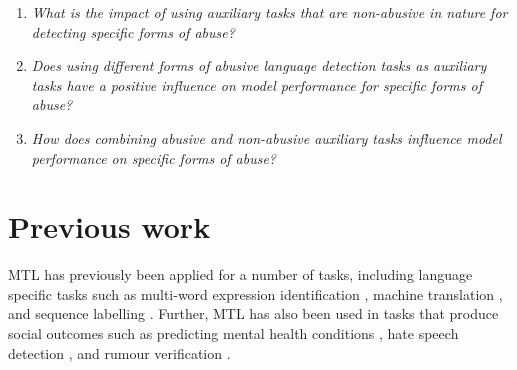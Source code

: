 \begin{minipage}{0.9\textwidth}
\vspace{5mm}
    \begin{enumerate}[start=1, label={\textbf{RQ \arabic*}}]
        \item{\textit{What is the impact of using auxiliary tasks that are non-abusive in nature for detecting specific forms of abuse?}}
        \item{\textit{Does using different forms of abusive language detection tasks as auxiliary tasks have a positive influence on model performance for specific forms of abuse?}}
        \item{\textit{How does combining abusive and non-abusive auxiliary tasks influence model performance on specific forms of abuse?}}
    \end{enumerate}
\end{minipage}

\section{Previous work}

MTL has previously been applied for a number of tasks, including language specific tasks such as multi-word expression identification \cite{Bingel-Bjerva:2018}, machine translation \cite{Dong:2015}, and sequence labelling \cite{Rei:2017}.
Further, MTL has also been used in tasks that produce social outcomes such as predicting mental health conditions \cite{Benton:2017}, hate speech detection \cite{Waseem:2018,Rajamanickam:2020,Farha:2020,Djandji:2019}, and rumour verification \cite{Kochkina:2018}.

